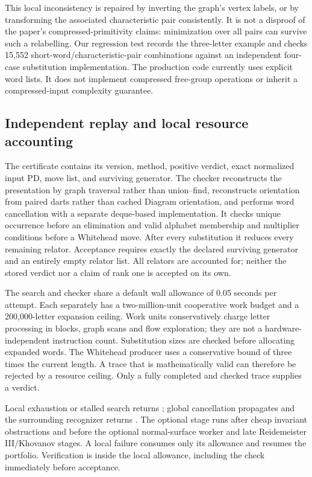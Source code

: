 This local inconsistency is repaired by inverting the graph's vertex
labels, or by transforming the associated characteristic pair
consistently.  It is not a disproof of the paper's compressed-primitivity
claims: minimization over all pairs can survive such a relabelling.  Our
regression test records the three-letter example and checks 15,552
short-word/characteristic-pair combinations against an independent
four-case substitution implementation.  The production code currently
uses explicit word lists.  It does not implement compressed free-group
operations or inherit a compressed-input complexity guarantee.

\subsection{Independent replay and local resource accounting}

The certificate contains its version, method, positive verdict, exact
normalized input PD, move list, and surviving generator.  The checker
reconstructs the presentation by graph traversal rather than union--find,
reconstructs orientation from paired darts rather than cached Diagram
orientation, and performs word cancellation with a separate deque-based
implementation.  It checks unique occurrence before an elimination and
valid alphabet membership and multiplier conditions before a Whitehead
move.  After every substitution it reduces every remaining relator.
Acceptance requires exactly the declared surviving generator and an
entirely empty relator list.  All relators are accounted for; neither the
stored verdict nor a claim of rank one is accepted on its own.

The search and checker share a default wall allowance of 0.05 seconds per
attempt.  Each separately has a two-million-unit cooperative work budget
and a 200,000-letter expansion ceiling.  Work units conservatively charge
letter processing in blocks, graph scans and flow exploration; they are
not a hardware-independent instruction count.  Substitution sizes are
checked before allocating expanded words.  The Whitehead producer uses a
conservative bound of three times the current length.  A trace that is
mathematically valid can therefore be rejected by a resource ceiling.
Only a fully completed and checked trace supplies a verdict.

Local exhaustion or stalled search returns ; global
cancellation propagates and the surrounding recognizer returns
.  The optional stage runs after cheap invariant
obstructions and before the optional normal-surface worker and late
Reidemeister III/Khovanov stages.  A local failure consumes only its
allowance and resumes the portfolio.  Verification is inside the local
allowance, including the check immediately before acceptance.

